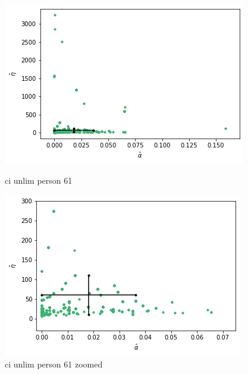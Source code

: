 \begin{figure}
    \centering
    \begin{minipage}{0.48\textwidth}
        \centering
        \includegraphics[scale=0.37]{pictures/ci_unlim_person61.png}
        \caption{ci unlim person 61}
        \label{fig:ci_unlim_person_61}
    \end{minipage}\hfill
    \begin{minipage}{0.48\textwidth}
        \centering
        \includegraphics[scale=0.37]{pictures/ci_unlim_person61_zoomed.png}
        \caption{ci unlim person 61 zoomed}
        \label{fig:ci_unlim_person_61_zoomed}
    \end{minipage}
\end{figure}

